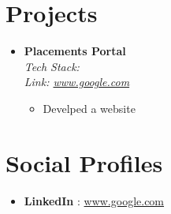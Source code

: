 \documentclass[a4paper,10pt]{article}
\begin{document}
\section*{Projects}
\begin{itemize}[leftmargin=*]
  
    \item \textbf{ Placements Portal }\\
    \textit{Tech Stack:  }%
    \\
    \textit{Link: \href{ www.google.com }{ www.google.com }}%
    

    \vspace{-0.5em} %
    \begin{itemize}[leftmargin=1.5em, itemsep=0pt, topsep=0pt]
      
        \item Develped a website
      
    \end{itemize}
    \vspace{-0.5em} %
  
\end{itemize}






\section*{Social Profiles}
\begin{itemize}[leftmargin=*]
  
    \item \textbf{ LinkedIn }: \href{ www.google.com }{ www.google.com }
  
\end{itemize}
\end{document}
